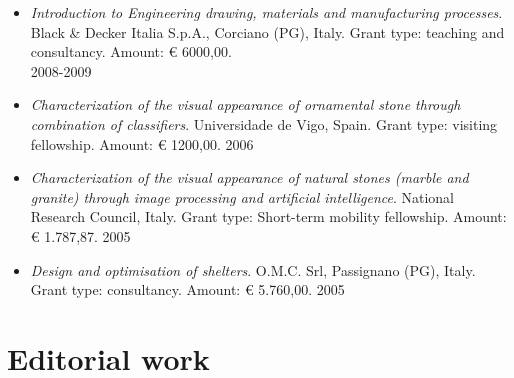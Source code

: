 \documentclass[11pt]{article}
\begin{document}
\begin{itemize}
	\item \emph{Introduction to Engineering drawing, materials and manufacturing processes}. Black \& Decker Italia S.p.A., Corciano (PG), Italy. Grant type: teaching and consultancy. Amount: € 6000,00. \\ \mbox{} \hfill 2008-2009
\end{itemize}

\begin{itemize}
	\item \emph{Characterization of the visual appearance of ornamental stone through combination of classifiers}. Universidade de Vigo, Spain. Grant type: visiting fellowship. Amount: € 1200,00. \hfill 2006
\end{itemize}

\begin{itemize}
	\item \emph{Characterization of the visual appearance of natural stones (marble and granite) through image processing and artificial intelligence}. National Research Council, Italy. Grant type: Short-term mobility fellowship. Amount: € 1.787,87. \hfill 2005
\end{itemize}

\begin{itemize}
	\item \emph{Design and optimisation of shelters}. O.M.C. Srl, Passignano (PG), Italy. Grant type: consultancy. Amount: € 5.760,00. \hfill 2005
\end{itemize}

\section*{Editorial work}
\end{document}
